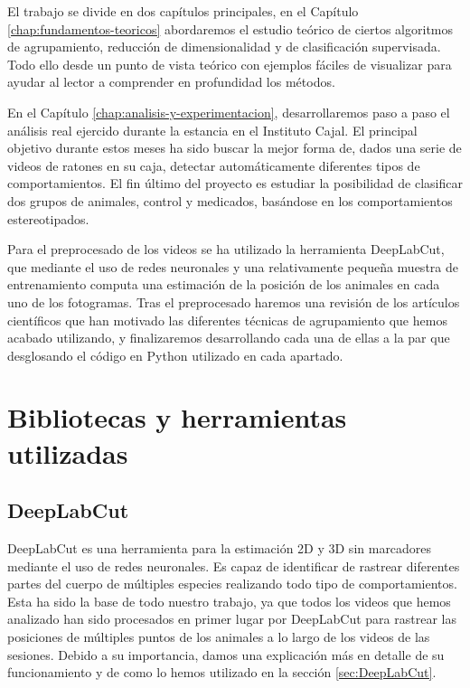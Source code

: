 El trabajo se divide en dos capítulos principales, en el Capítulo \ref{chap:fundamentos-teoricos} abordaremos el estudio teórico de ciertos algoritmos de agrupamiento, reducción de dimensionalidad y de clasificación supervisada. Todo ello desde un punto de vista teórico con ejemplos fáciles de visualizar para ayudar al lector a comprender en profundidad los métodos.

En el Capítulo \ref{chap:analisis-y-experimentacion}, desarrollaremos paso a paso el análisis real ejercido durante la estancia en el Instituto Cajal. El principal objetivo durante estos meses ha sido buscar la mejor forma de, dados una serie de videos de ratones en su caja, detectar automáticamente diferentes tipos de comportamientos. El fin último del proyecto es estudiar la posibilidad de clasificar dos grupos de animales, control y medicados, basándose en los comportamientos estereotipados.

Para el preprocesado de los videos se ha utilizado la herramienta DeepLabCut, que mediante el uso de redes neuronales y una relativamente pequeña muestra de entrenamiento computa una estimación de la posición de los animales en cada uno de los fotogramas. Tras el preprocesado haremos una revisión de los artículos científicos que han motivado las diferentes técnicas de agrupamiento que hemos acabado utilizando, y finalizaremos desarrollando cada una de ellas a la par que desglosando el código en Python utilizado en cada apartado.

\section{Bibliotecas y herramientas utilizadas} \label{sec:herramientas}

\subsection*{DeepLabCut}
DeepLabCut \cite{deeplabcut} es una herramienta para la estimación 2D y 3D sin marcadores mediante el uso de redes neuronales. Es capaz de identificar de rastrear diferentes partes del cuerpo de múltiples especies realizando todo tipo de comportamientos. Esta ha sido la base de todo nuestro trabajo, ya que todos los videos que hemos analizado han sido procesados en primer lugar por DeepLabCut para rastrear las posiciones de múltiples puntos de los animales a lo largo de los videos de las sesiones. Debido a su importancia, damos una explicación más en detalle de su funcionamiento y de como lo hemos utilizado en la sección \ref{sec:DeepLabCut}.

